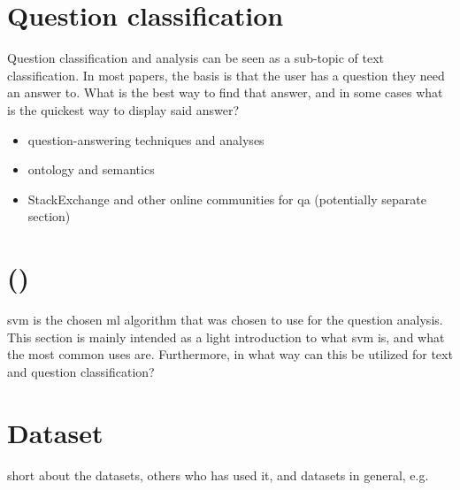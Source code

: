 \section{Question classification}
\label{sec:question_classification}
Question classification and analysis can be seen as a sub-topic of text classification. 
In most papers, the basis is that the user has a question they need an answer to. 
What is the best way to find that answer, and in some cases what is the quickest way to display said answer?
 
\begin{itemize}
	\item question-answering techniques and analyses
	\item ontology and semantics
	\item StackExchange and other online communities for \gls{qa} (potentially separate section)
\end{itemize}

\section[SVM]{ ()}
\label{sec:svm}
\gls{svm} is the chosen \gls{ml} algorithm that was chosen to use for the question analysis. 
This section is mainly intended as a light introduction to what \gls{svm} is, and what the most common uses are. 
Furthermore, in what way can this be utilized for text and question classification?

\section{Dataset}
\label{sec:dataset}
short about the datasets, others who has used it, and datasets in general, e.g. 
\cite{Klein2016,SpaceMachine.net2016,Wissner-Gross2016}
